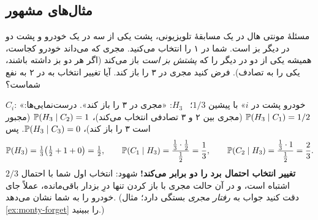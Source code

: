 \subsection{مثال‌های مشهور}

\begin{example}[label=ex:monty]{مسئلهٔ مونتی هال}
در یک مسابقهٔ تلویزیونی، پشت یکی از سه در یک خودرو و پشت دو در دیگر بز است. شما در ۱ را انتخاب می‌کنید. مجری که می‌داند خودرو کجاست، همیشه یکی از دو در دیگر را که \emph{پشتش بز است} باز می‌کند (اگر هر دو بز داشته باشند، یکی را به تصادف). فرض کنید مجری در ۳ را باز کند. آیا تغییر انتخاب به در ۲ به نفع شماست؟
\begin{solution}
$C_i$: «خودرو پشت در $i$» با پیشین $1/3$؛ \ $H_3$: «مجری در ۳ را باز کند». درست‌نمایی‌ها:
$\P(H_3\mid C_1)=1/2$ (مجری بین ۲ و ۳ تصادفی انتخاب می‌کند)، $\P(H_3\mid C_2)=1$ (مجبور است ۳ را باز کند)، $\P(H_3\mid C_3)=0$. پس
\[ \P(H_3)=\tfrac13\bigl(\tfrac12+1+0\bigr)=\tfrac12,\qquad
   \P(C_1\mid H_3)=\frac{\frac13\cdot\frac12}{\frac12}=\frac13,\qquad
   \P(C_2\mid H_3)=\frac{\frac13\cdot1}{\frac12}=\frac23. \]
\textbf{تغییر انتخاب احتمال برد را دو برابر می‌کند!} شهود: انتخاب اول شما با احتمال $2/3$ اشتباه است، و در آن حالت مجری با باز کردن تنها درِ بزدار باقی‌مانده، عملاً جای خودرو را به شما نشان می‌دهد.
(دقت کنید جواب به \emph{رفتار مجری} بستگی دارد؛ مثال \ref{ex:monty-forget} را ببینید.)
\end{solution}
\end{example}

